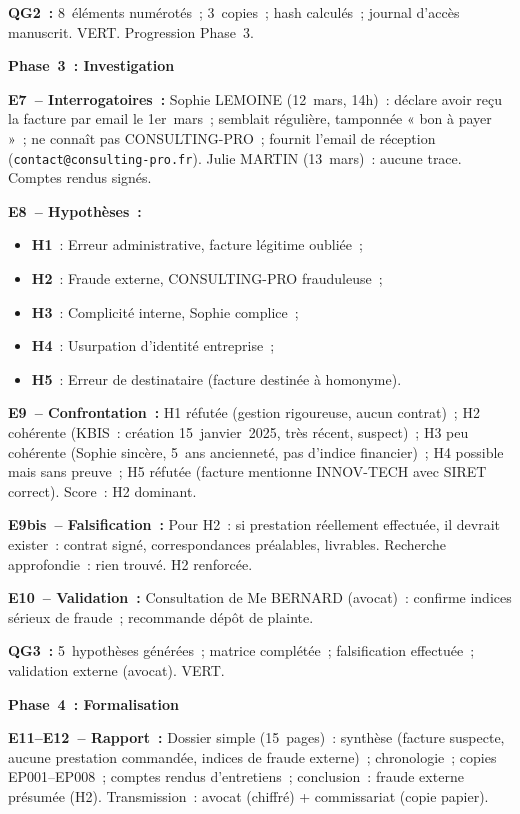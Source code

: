 \textbf{QG2~:} 8~éléments numérotés~; 3~copies~; hash calculés~; journal
d'accès manuscrit. VERT. Progression Phase~3.

\textbf{Phase~3~: Investigation}

\textbf{E7~-- Interrogatoires~:} Sophie LEMOINE (12~mars, 14h)~: déclare avoir
reçu la facture par email le 1er~mars~; semblait régulière, tamponnée
« bon à payer »~; ne connaît pas CONSULTING-PRO~; fournit l'email de réception
(\texttt{contact@consulting-pro.fr}). Julie MARTIN (13~mars)~: aucune trace.
Comptes rendus signés.

\textbf{E8~-- Hypothèses~:}
\begin{itemize}
    \item \textbf{H1}~: Erreur administrative, facture légitime oubliée~;
    \item \textbf{H2}~: Fraude externe, CONSULTING-PRO frauduleuse~;
    \item \textbf{H3}~: Complicité interne, Sophie complice~;
    \item \textbf{H4}~: Usurpation d'identité entreprise~;
    \item \textbf{H5}~: Erreur de destinataire (facture destinée à homonyme).
\end{itemize}

\textbf{E9~-- Confrontation~:} H1 réfutée (gestion rigoureuse, aucun contrat)~;
H2 cohérente (KBIS~: création 15~janvier~2025, très récent, suspect)~;
H3 peu cohérente (Sophie sincère, 5~ans ancienneté, pas d'indice financier)~;
H4 possible mais sans preuve~; H5 réfutée (facture mentionne INNOV-TECH
avec SIRET correct). Score~: H2 dominant.

\textbf{E9bis~-- Falsification~:} Pour H2~: si prestation réellement effectuée,
il devrait exister~: contrat signé, correspondances préalables, livrables.
Recherche approfondie~: rien trouvé. H2 renforcée.

\textbf{E10~-- Validation~:} Consultation de Me BERNARD (avocat)~: confirme
indices sérieux de fraude~; recommande dépôt de plainte.

\textbf{QG3~:} 5~hypothèses générées~; matrice complétée~; falsification
effectuée~; validation externe (avocat). VERT.

\textbf{Phase~4~: Formalisation}

\textbf{E11--E12~-- Rapport~:} Dossier simple (15~pages)~: synthèse
(facture suspecte, aucune prestation commandée, indices de fraude externe)~;
chronologie~; copies EP001--EP008~; comptes rendus d'entretiens~;
conclusion~: fraude externe présumée (H2). Transmission~: avocat (chiffré)
+ commissariat (copie papier).

